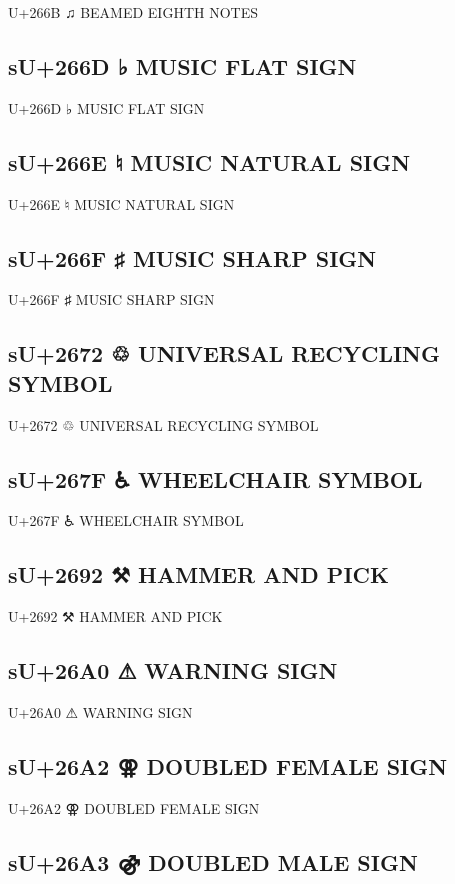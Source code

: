 U+266B ♫ BEAMED EIGHTH NOTES

\subsection{sU+266D ♭ MUSIC FLAT SIGN}

U+266D ♭ MUSIC FLAT SIGN

\subsection{sU+266E ♮ MUSIC NATURAL SIGN}

U+266E ♮ MUSIC NATURAL SIGN

\subsection{sU+266F ♯ MUSIC SHARP SIGN}

U+266F ♯ MUSIC SHARP SIGN

\subsection{sU+2672 ♲ UNIVERSAL RECYCLING SYMBOL}

U+2672 ♲ UNIVERSAL RECYCLING SYMBOL

\subsection{sU+267F ♿ WHEELCHAIR SYMBOL}

U+267F ♿ WHEELCHAIR SYMBOL

\subsection{sU+2692 ⚒ HAMMER AND PICK}

U+2692 ⚒ HAMMER AND PICK

\subsection{sU+26A0 ⚠ WARNING SIGN}

U+26A0 ⚠ WARNING SIGN

\subsection{sU+26A2 ⚢ DOUBLED FEMALE SIGN}

U+26A2 ⚢ DOUBLED FEMALE SIGN

\subsection{sU+26A3 ⚣ DOUBLED MALE SIGN}

